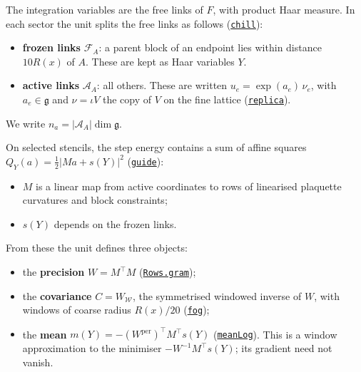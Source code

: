 \documentclass[
  letterpaper,
  11pt]{article}
\providecommand{\tightlist}{%
  \setlength{\itemsep}{0pt}\setlength{\parskip}{0pt}}
\begin{document}
The integration variables are the free links of \(F\), with product Haar
measure. In each sector the unit splits the free links as follows
(\href{https://github.com/yang-mills-group/OpenAI-YM-20261028/blob/3456e5e75cf8d4cd558955a5c7638fba2d68f464/YM/SectorNext/GAUSSIAN_SECTOR_CHANGE/Shell.lean\#L38-L40}{\texttt{chill}}):

\begin{itemize}
\tightlist
\item
  \textbf{frozen links} \(\mathcal F_A\): a parent block of an endpoint
  lies within distance \(10R(x)\) of \(A\). These are kept as Haar
  variables \(Y\).
\item
  \textbf{active links} \(\mathcal A_A\): all others. These are written
  \(u_e=\exp(a_e)\,\nu_e\), with \(a_e\in\mathfrak g\) and
  \(\nu=\iota V\) the copy of \(V\) on the fine lattice
  (\href{https://github.com/yang-mills-group/OpenAI-YM-20261028/blob/3456e5e75cf8d4cd558955a5c7638fba2d68f464/YM/PCalc/Chart.lean\#L35-L36}{\texttt{replica}}).
\end{itemize}

We write \(n_a=|\mathcal A_A|\dim\mathfrak g\).

On selected stencils, the step energy contains a sum of affine squares
\(Q_Y(a)=\tfrac12\lvert Ma+s(Y)\rvert^2\)
(\href{https://github.com/yang-mills-group/OpenAI-YM-20261028/blob/3456e5e75cf8d4cd558955a5c7638fba2d68f464/YM/SectorNext/GAUSSIAN_SECTOR_CHANGE/Remainder.lean\#L37}{\texttt{guide}}):

\begin{itemize}
\tightlist
\item
  \(M\) is a linear map from active coordinates to rows of linearised
  plaquette curvatures and block constraints;
\item
  \(s(Y)\) depends on the frozen links.
\end{itemize}

From these the unit defines three objects:

\begin{itemize}
\tightlist
\item
  the \textbf{precision} \(W=M^{\top}M\)
  (\href{https://github.com/yang-mills-group/OpenAI-YM-20261028/blob/3456e5e75cf8d4cd558955a5c7638fba2d68f464/YM/SectorNext/GAUSSIAN_SECTOR_CHANGE/Remainder.lean\#L27}{\texttt{Rows.gram}});
\item
  the \textbf{covariance} \(C=W_{\mathcal W}\), the symmetrised windowed
  inverse of \(W\), with windows of coarse radius \(R(x)/20\)
  (\href{https://github.com/yang-mills-group/OpenAI-YM-20261028/blob/3456e5e75cf8d4cd558955a5c7638fba2d68f464/YM/SectorNext/GAUSSIAN_SECTOR_CHANGE/Chosen.lean\#L69-L70}{\texttt{fog}});
\item
  the \textbf{mean} \(m(Y)=-(W^{\mathrm{per}})^{\top}M^{\top}s(Y)\)
  (\href{https://github.com/yang-mills-group/OpenAI-YM-20261028/blob/3456e5e75cf8d4cd558955a5c7638fba2d68f464/YM/SectorNext/GAUSSIAN_SECTOR_CHANGE/Chosen.lean\#L72-L74}{\texttt{meanLog}}).
  This is a window approximation to the minimiser
  \(-W^{-1}M^{\top}s(Y)\); its gradient need not vanish.
\end{itemize}
\end{document}
